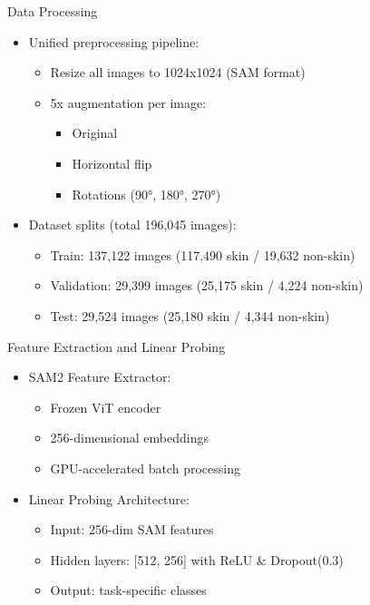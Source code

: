 \documentclass[aspectratio=169]{beamer}
\begin{document}
\begin{frame}{Data Processing}
  \begin{itemize}
    \item Unified preprocessing pipeline:
      \begin{itemize}
        \item Resize all images to 1024x1024 (SAM format)
        \item 5x augmentation per image:
          \begin{itemize}
            \item Original
            \item Horizontal flip
            \item Rotations (90°, 180°, 270°)
          \end{itemize}
      \end{itemize}
    \item Dataset splits (total 196,045 images):
      \begin{itemize}
        \item Train: 137,122 images (117,490 skin / 19,632 non-skin)
        \item Validation: 29,399 images (25,175 skin / 4,224 non-skin)
        \item Test: 29,524 images (25,180 skin / 4,344 non-skin)
      \end{itemize}
  \end{itemize}
\end{frame}

\begin{frame}{Feature Extraction and Linear Probing}
  \begin{itemize}
    \item SAM2 Feature Extractor:
      \begin{itemize}
        \item Frozen ViT encoder
        \item 256-dimensional embeddings
        \item GPU-accelerated batch processing
      \end{itemize}
    \item Linear Probing Architecture:
      \begin{itemize}
        \item Input: 256-dim SAM features
        \item Hidden layers: [512, 256] with ReLU \& Dropout(0.3)
        \item Output: task-specific classes
      \end{itemize}
  \end{itemize}
\end{frame}
\end{document}
